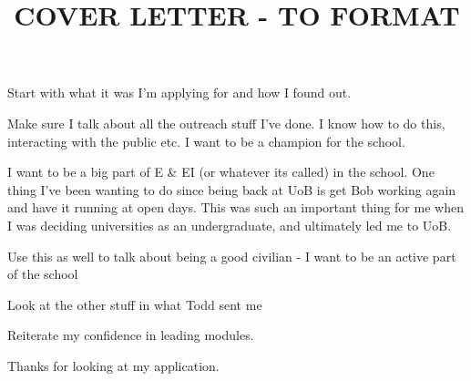 \documentclass[12pt]{article}
\title{COVER LETTER - TO FORMAT}
\date{}
\author{}
\begin{document}
\maketitle
\thispagestyle{empty}

Start with what it was I'm applying for and how I found out.

Make sure I talk about all the outreach stuff I've done.
%
I know how to do this, interacting with the public etc.
%
I want to be a champion for the school.

I want to be a big part of E \& EI (or whatever its called) in the school.
%
One thing I've been wanting to do since being back at UoB is get Bob working again and have it running at open days.
%
This was such an important thing for me when I was deciding universities as an undergraduate, and ultimately led me to UoB.

Use this as well to talk about being a good civilian - I want to be an active part of the school

Look at the other stuff in what Todd sent me

Reiterate my confidence in leading modules.

Thanks for looking at my application.
\end{document}
